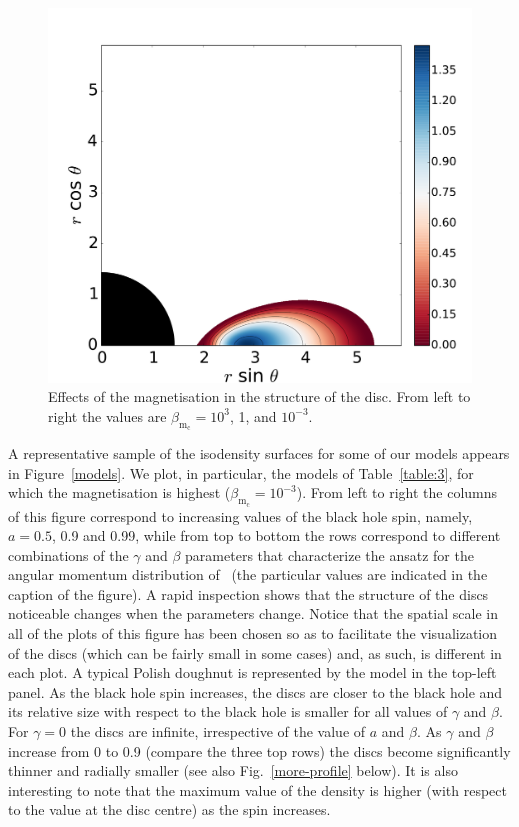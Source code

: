 \documentclass[referee]{aa}
\begin{document}
\begin{figure}[t]
\includegraphics[scale=0.14]{figures/fig3c.pdf}
\caption{Effects of the magnetisation in the structure of the disc. From left to right the values are $\beta_{\mathrm{m}_{\mathrm{c}}}
=10^3$, 1, and $10^{-3}$.}
\label{magnetisation}%
\end{figure}

A representative sample of the isodensity surfaces for some of our models appears in Figure~\ref{models}. We plot, in particular, the models of Table~\ref{table:3}, for which the magnetisation is highest ($\beta_{\mathrm{m}_{\mathrm{c}}}=10^{-3}$). From left to right the columns of this figure correspond to increasing values of the black hole spin, namely, $a=0.5$, 0.9 and 0.99, while from top to bottom the rows correspond to different combinations of the $\gamma$ and $\beta$ parameters that characterize the ansatz for the angular momentum distribution of~\citet{Qian:2009} (the particular values are indicated in the caption of the figure).  A rapid inspection shows that the structure of the discs noticeable changes when the parameters change. Notice that the spatial scale in all of the plots of this figure has been chosen so as to facilitate the visualization of the discs (which can be fairly small in some cases) and, as such, is different in each plot. A typical Polish doughnut is represented by the model in the top-left panel. As the black hole spin increases, the discs are closer to the black hole and its relative size with respect to the black hole is smaller for all values of $\gamma$ and $\beta$. For $\gamma=0$ the discs are infinite, irrespective of the value of $a$ and $\beta$. As $\gamma$ and $\beta$ increase from 0 to 0.9 (compare the three top rows) the discs become significantly thinner and radially smaller (see also Fig.~\ref{more-profile} below). It is also interesting to note that the maximum value of the density is higher (with respect to the value at the disc centre) as the spin increases.
\end{document}

